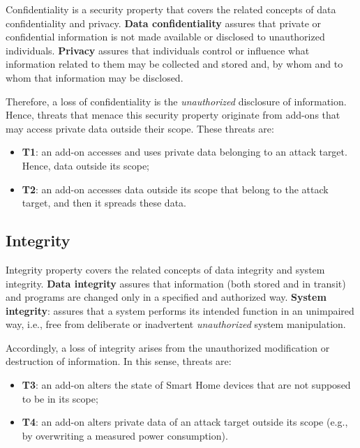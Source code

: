 Confidentiality is a security property that covers the related concepts of data confidentiality and privacy. 
\textbf{Data confidentiality} assures that private or confidential information is not made available or disclosed to unauthorized individuals. \textbf{Privacy} assures that individuals control or influence what information related to them may be collected and stored and, by whom and to whom that information may be disclosed.

Therefore, a loss of confidentiality is the \textit{unauthorized} disclosure of information. Hence, threats that menace this security property originate from add-ons that may access private data outside their scope. These threats are:

\begin{itemize}
    \item  \textbf{T1}: an add-on accesses and uses private data belonging to an attack target. Hence, data outside its scope; 

    \item \textbf{T2}: an add-on accesses data outside its scope that belong to the attack target, and then it spreads these data.
\end{itemize}



\subsection{Integrity}
\label{t3}\label{t4}

Integrity property covers the related concepts of data integrity and system integrity. \textbf{Data integrity} assures that information (both stored and in transit) and programs are changed only in a specified and authorized way. \textbf{System integrity}: assures that a system performs its intended function in an unimpaired way, i.e., free from deliberate or inadvertent \textit{unauthorized} system manipulation.

Accordingly, a loss of integrity arises from the unauthorized modification or destruction of information. In this sense, threats are:

\begin{itemize}
    \item \textbf{T3}: an add-on alters the state of Smart Home devices that are not supposed to be in its scope;
    \item \textbf{T4}: an add-on alters private data of an attack target outside its scope (e.g., by overwriting a measured power consumption).
\end{itemize}



